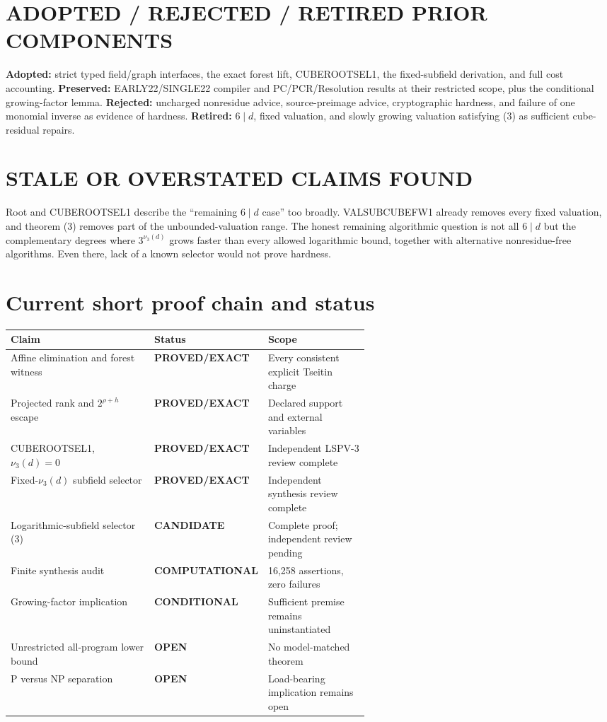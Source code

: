\documentclass[11pt]{article}
\newcommand{\EXACT}{\textbf{PROVED/EXACT}}
\newcommand{\COMP}{\textbf{COMPUTATIONAL}}
\newcommand{\COND}{\textbf{CONDITIONAL}}
\newcommand{\CAND}{\textbf{CANDIDATE}}
\newcommand{\OPEN}{\textbf{OPEN}}
\begin{document}
\section{ADOPTED / REJECTED / RETIRED PRIOR COMPONENTS}
\textbf{Adopted:} strict typed field/graph interfaces, the exact forest lift,
CUBEROOTSEL1, the fixed-subfield derivation, and full cost accounting.
\textbf{Preserved:} EARLY22/SINGLE22 compiler and PC/PCR/Resolution results
at their restricted scope, plus the conditional growing-factor lemma.
\textbf{Rejected:} uncharged nonresidue advice, source-preimage advice,
cryptographic hardness, and failure of one monomial inverse as evidence of
hardness.  \textbf{Retired:} $6\mid d$, fixed valuation, and slowly growing
valuation satisfying (3) as sufficient cube-residual repairs.

\section{STALE OR OVERSTATED CLAIMS FOUND}
Root and CUBEROOTSEL1 describe the ``remaining $6\mid d$ case'' too broadly.
VALSUBCUBEFW1 already removes every fixed valuation, and theorem (3) removes
part of the unbounded-valuation range.  The honest remaining algorithmic
question is not all $6\mid d$ but the complementary degrees where
$3^{\nu_3(d)}$ grows faster than every allowed logarithmic bound, together
with alternative nonresidue-free algorithms.  Even there, lack of a known
selector would not prove hardness.

\section{Current short proof chain and status}
\begin{center}
\begin{tabularx}{0.98\linewidth}{p{0.40\linewidth}p{0.19\linewidth}X}
\toprule
Claim & Status & Scope \\
\midrule
Affine elimination and forest witness & \EXACT & Every consistent explicit Tseitin charge \\
Projected rank and $2^{\rho+h}$ escape & \EXACT & Declared support and external variables \\
CUBEROOTSEL1, $\nu_3(d)=0$ & \EXACT & Independent LSPV-3 review complete \\
Fixed-$\nu_3(d)$ subfield selector & \EXACT & Independent synthesis review complete \\
Logarithmic-subfield selector (3) & \CAND & Complete proof; independent review pending \\
Finite synthesis audit & \COMP & 16,258 assertions, zero failures \\
Growing-factor implication & \COND & Sufficient premise remains uninstantiated \\
Unrestricted all-program lower bound & \OPEN & No model-matched theorem \\
P versus NP separation & \OPEN & Load-bearing implication remains open \\
\bottomrule
\end{tabularx}
\end{center}
\end{document}
